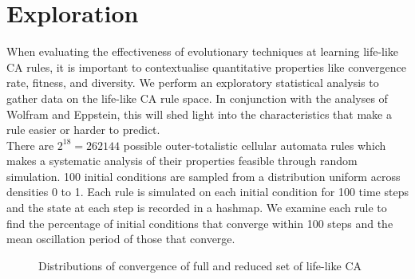 \section{Exploration}

When evaluating the effectiveness of evolutionary techniques at learning life-like CA rules, it is important to contextualise quantitative properties like convergence rate, fitness, and diversity. We perform an exploratory statistical analysis to gather data on the life-like CA rule space. In conjunction with the analyses of Wolfram\cite{wolfram1986theory} and Eppstein\cite{eppstein2010growth}, this will shed light into the characteristics that make a rule easier or harder to predict.\\

There are $2^{18} = 262144$ possible outer-totalistic cellular automata rules which makes a systematic analysis of their properties feasible through random simulation. 100 initial conditions are sampled from a distribution uniform across densities 0 to 1. Each rule is simulated on each initial condition for 100 time steps and the state at each step is recorded in a hashmap. We examine each rule to find the percentage of initial conditions that converge within 100 steps and the mean oscillation period of those that converge.\\   

\begin{figure}[!h]
\centering
            \hfill
            \hfill
            \caption{Distributions of convergence of full and reduced set of life-like CA}
\label{fig:taxonomy-dist}
\end{figure}

